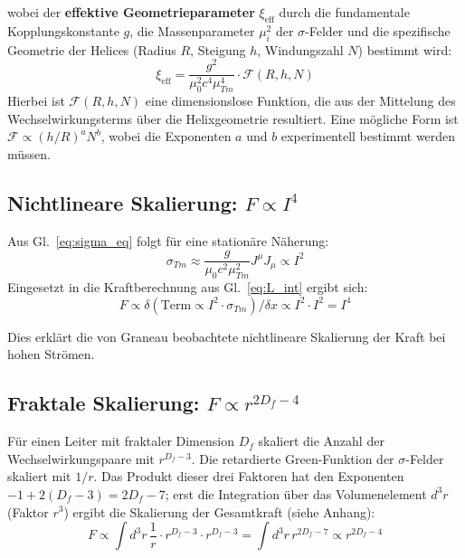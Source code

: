 	wobei der \textbf{effektive Geometrieparameter} $\xi_{\text{eff}}$ durch die fundamentale Kopplungskonstante $g$, die Massenparameter $\mu_i^2$ der $\sigma$-Felder und die spezifische Geometrie der Helices (Radius $R$, Steigung $h$, Windungszahl $N$) bestimmt wird:
	\begin{equation}
		\xi_{\text{eff}} = \frac{g^2}{\mu_0^2 c^4 \mu_{Tm}^4} \cdot \mathcal{F}(R, h, N) \label{eq:xi_effective}
	\end{equation}
	Hierbei ist $\mathcal{F}(R, h, N)$ eine dimensionslose Funktion, die aus der Mittelung des Wechselwirkungsterms über die Helixgeometrie resultiert. Eine mögliche Form ist $\mathcal{F} \propto (h/R)^a N^b$, wobei die Exponenten $a$ und $b$ experimentell bestimmt werden müssen.
	
	\subsection{Nichtlineare Skalierung: $F \propto I^4$}
	Aus Gl.~\ref{eq:sigma_eq} folgt für eine stationäre Näherung:
	\begin{equation}
		\sigma_{Tm} \approx \frac{g}{\mu_0 c^2 \mu_{Tm}^2} J^\mu J_\mu \propto I^2
	\end{equation}
	Eingesetzt in die Kraftberechnung aus Gl.~\ref{eq:L_int} ergibt sich:
	\begin{equation}
		F \propto \delta\left(\text{Term} \propto I^2 \cdot \sigma_{Tm}\right)/\delta x \propto I^2 \cdot I^2 = I^4 \label{eq:I4_scaling}
	\end{equation}
	
	Dies erklärt die von Graneau beobachtete nichtlineare Skalierung der Kraft bei hohen Strömen.
	
	\subsection{Fraktale Skalierung: $F \propto r^{2D_f - 4}$}
	Für einen Leiter mit fraktaler Dimension $D_f$ skaliert die Anzahl der Wechselwirkungspaare mit $r^{D_f - 3}$. Die retardierte Green-Funktion der $\sigma$-Felder skaliert mit $1/r$. Das Produkt dieser drei Faktoren hat den Exponenten $-1 + 2(D_f-3) = 2D_f - 7$; erst die Integration über das Volumenelement $d^3r$ (Faktor $r^3$) ergibt die Skalierung der Gesamtkraft (siehe Anhang):
	\begin{equation}
		F \propto \int d^3r \, \frac{1}{r} \cdot r^{D_f - 3} \cdot r^{D_f - 3} = \int d^3r \, r^{2D_f - 7} \propto r^{2D_f - 4} \label{eq:fractal_scaling}
	\end{equation}

